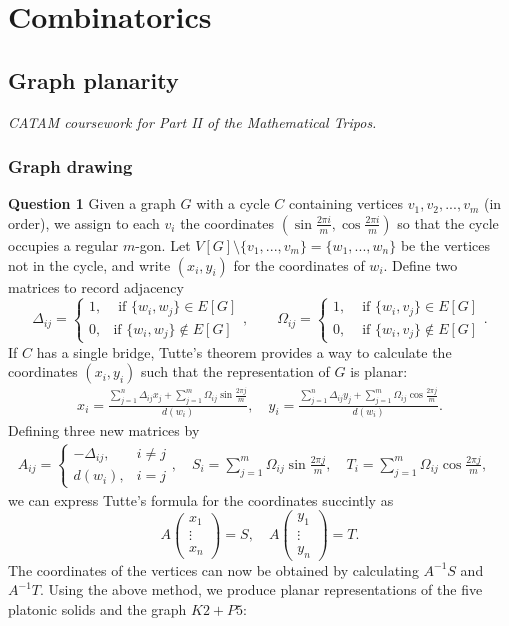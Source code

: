 \documentclass[12pt]{article}
\begin{document}
\setcounter{section}{16}
\section{Combinatorics}
\setcounter{subsection}{6}
\subsection{Graph planarity}
\emph{CATAM coursework for Part II of the Mathematical Tripos.}

\subsubsection{Graph drawing}
\textbf{Question 1}\quad 
Given a graph \(G\) with a cycle \(C\) containing vertices \(v_1,v_2,...,v_m\)
(in order), we assign to each \(v_i\) the coordinates \((\sin \frac{2\pi i}{m},
\cos\frac{2\pi i}{m})\) so that the cycle occupies a regular \(m\)-gon. Let
\(V[G]\setminus\{v_1,...,v_m\}=\{w_1,...,w_n\}\) be the vertices not in the
cycle, and  write \((x_i,y_i)\) for the coordinates of \(w_i\). Define two
matrices to record adjacency
\[\Delta_{ij} = \begin{cases} 1, &\text{ if }\{w_i,w_j\}\in E[G] \\ 0, &\text{
    if }\{w_i,w_j\}\notin E[G] \end{cases}, \qquad \Omega_{ij} = \begin{cases} 1, &\text{ if }\{w_i,v_j\}\in E[G] \\ 0, &\text{ if }\{w_i,v_j\}\notin E[G] \end{cases}.\]
If \(C\) has a single bridge, Tutte's theorem provides a way to calculate the
coordinates \((x_i,y_i)\) such that the representation of \(G\) is planar: 
\begin{gather*}
    x_i = \frac{\sum_{j=1}^n \Delta_{ij}x_j + \sum_{j=1}^m
\Omega_{ij}\sin \frac{2\pi j}{m} }{d(w_i)}, \quad 
    y_i = \frac{\sum_{j=1}^n \Delta_{ij}y_j + \sum_{j=1}^m
\Omega_{ij}\cos \frac{2\pi j}{m} }{d(w_i)}.
\end{gather*}
Defining three new matrices by 
\begin{gather*}
    A_{ij}=\begin{cases}-\Delta_{ij}, &i\neq j\\ 
    d(w_i), &i=j\end{cases}, \quad
    S_i = \sum_{j=1}^m \Omega_{ij}\sin\frac{2\pi j}{m}, \quad
    T_i = \sum_{j=1}^m \Omega_{ij}\cos\frac{2\pi j}{m}, \quad
\end{gather*}
we can express Tutte's formula for the coordinates succintly as 
\[A\begin{pmatrix} x_1 \\ \vdots \\ x_n\end{pmatrix} = S, \quad 
  A\begin{pmatrix} y_1 \\ \vdots \\ y_n\end{pmatrix} = T. \]
  The coordinates of the vertices can now be obtained by calculating \(A^{-1}S\)
  and \(A^{-1}T\). Using the above method, we produce planar representations of the five
  platonic solids and the graph \(K2+P5\):
\end{document}
